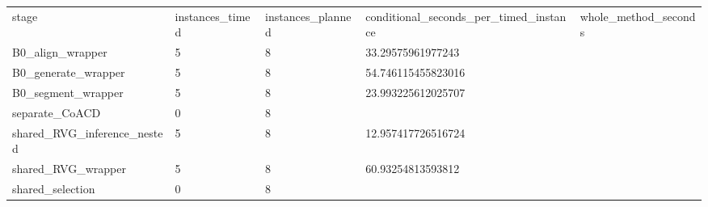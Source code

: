 \begin{tabular}{lllll}
stage & instances\_timed & instances\_planned & conditional\_seconds\_per\_timed\_instance & whole\_method\_seconds \\
B0\_align\_wrapper & 5 & 8 & 33.29575961977243 &  \\
B0\_generate\_wrapper & 5 & 8 & 54.746115455823016 &  \\
B0\_segment\_wrapper & 5 & 8 & 23.993225612025707 &  \\
separate\_CoACD & 0 & 8 &  &  \\
shared\_RVG\_inference\_nested & 5 & 8 & 12.957417726516724 &  \\
shared\_RVG\_wrapper & 5 & 8 & 60.93254813593812 &  \\
shared\_selection & 0 & 8 &  &  \\
\end{tabular}
